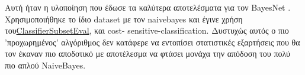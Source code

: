 Αυτή ήταν  η υλοποίηση που  έδωσε τα καλύτερα αποτελέσματα για τον BayesNet .
Χρησιμοποιήθηκε το ίδιο dataset με τον naivebayes και έγινε χρήση 
του\href{http://weka.sourceforge.net/doc.stable/weka/attributeSelection/ClassifierSubsetEval.html}
{ClassifierSubsetEval},  και  cost- sensitive-classification. Δυστυχώς αυτός ο πιο  'προχωρημένος' αλγόριθμος δεν 
κατάφερε να εντοπίσει στατιστικές εξαρτήσεις που θα τον έκαναν πιο αποδοτικό με αποτέλεσμα να φτάσει 
μονάχα την απόδοση του πολύ πιο απλού NaiveBayes.